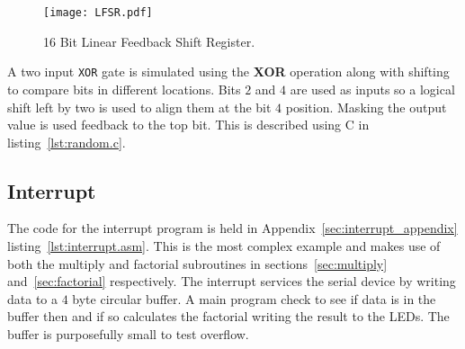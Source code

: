 \begin{figure}[ht]
   \centering
    \texttt{[image: LFSR.pdf]}
		\caption{16 Bit Linear Feedback Shift Register.}%
   \label{fig:lfsr}
\end{figure}

A two input \texttt{XOR} gate is simulated using the \textbf{XOR} operation along with shifting to compare bits in different locations.
Bits $2$ and $4$ are used as inputs so a logical shift left by two is used to align them at the bit $4$ position. 
Masking the output value is used feedback to the top bit.
This is described using C in listing~\ref{lst:random.c}. 

\begin{minipage}{\linewidth}

\end{minipage}




\subsection{Interrupt}
The code for the interrupt program is held in Appendix~\ref{sec:interrupt_appendix} listing~\ref{lst:interrupt.asm}.
This is the most complex example and makes use of both the multiply and factorial subroutines in sections~\ref{sec:multiply} and~\ref{sec:factorial} respectively.
The interrupt services the serial device by writing data to a $4$ byte circular buffer. 
A main program check to see if data is in the buffer then and if so calculates the factorial writing the result to the LEDs.
The buffer is purposefully small to test overflow.






